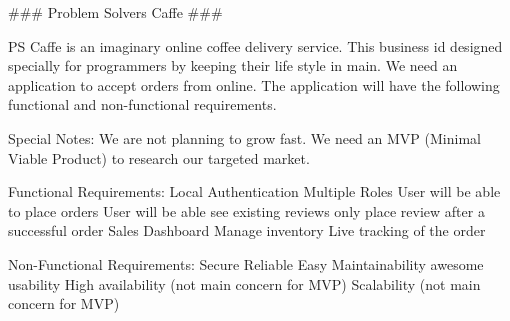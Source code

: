 ### Problem Solvers Caffe ###

PS Caffe is an imaginary online coffee delivery service. This business id designed specially for programmers by keeping their life style in main. We need an application to accept orders from online. The application will have the following functional and non-functional requirements.


Special Notes: We are not planning to grow fast. We need an MVP (Minimal Viable Product) to research our targeted market.


Functional Requirements:
    Local Authentication
    Multiple Roles
    User will be able to place orders
    User will be able see existing reviews only place   review after a successful order
    Sales Dashboard
    Manage inventory
    Live tracking of the order


Non-Functional Requirements:
    Secure
    Reliable
    Easy Maintainability
    awesome usability
    High availability (not main concern for MVP)
    Scalability (not main concern for MVP)